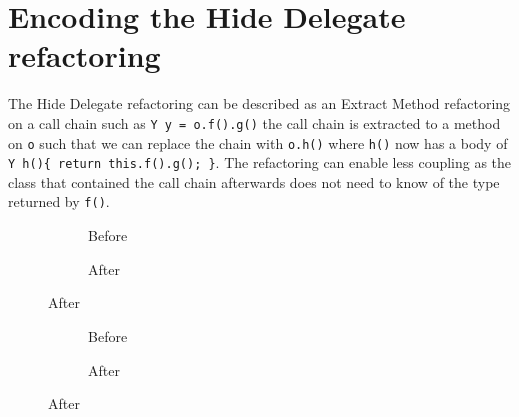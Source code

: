 \section{Encoding the Hide Delegate refactoring}\label{sec:hideDelegate}

The Hide Delegate refactoring can be described as an Extract Method refactoring on a call chain such as \lstinline[style=smallJava]|Y y = o.f().g()|
the call chain is extracted to a method on \lstinline[style=smallJava]|o| such that we can replace the chain with \lstinline[style=smallJava]|o.h()|
where \lstinline[style=smallJava]|h()| now has a body of \lstinline[style=smallJava]|Y h(){ return this.f().g(); }|.
The refactoring can enable less
coupling as the class that contained the call chain afterwards does not need to know of the type returned by \lstinline[style=smallJava]|f()|.


\begin{figure}
  \centering
  \begin{subfigure}{.4\linewidth}
    
    \caption{Before}
  \end{subfigure}\hspace{1cm}
  \begin{subfigure}{.4\linewidth}
    
    \caption{After}
  \end{subfigure}
\label{lst:HideDelegate-refinity}
\end{figure}

\begin{figure}
  \centering
  \begin{subfigure}{.4\linewidth}
    
    \caption{Before}
  \end{subfigure}\hspace{1cm}
  \begin{subfigure}{.4\linewidth}
    
    \caption{After}
  \end{subfigure}
\label{lst:HideDelegate-refinity}
\end{figure}

